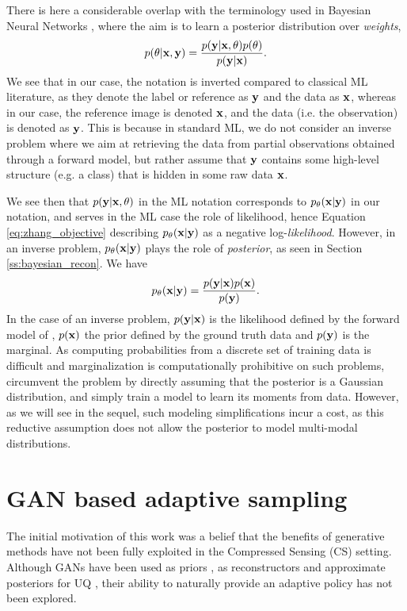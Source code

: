 \begin{remark}
    There is here a considerable overlap with the terminology used in Bayesian Neural Networks \citep{kendall2017uncertainties}, where the aim is to learn a posterior distribution over \textit{weights}, 
    $$p(\theta|{\mathbf{x}},{\mathbf{y}}) = \frac{p({\mathbf{y}}|{\mathbf{x}},\theta) p(\theta)}{p({\mathbf{y}}|{\mathbf{x}})}.$$
    We see that in our case, the notation is inverted compared to classical ML literature, as they denote the label or reference as ${\mathbf{y}}$ and the data as ${\mathbf{x}}$, whereas in our case, the reference image is denoted ${\mathbf{x}}$, and the data (i.e. the observation) is denoted as ${\mathbf{y}}$. This is because in standard ML, we do not consider an inverse problem where we aim at retrieving the data from partial observations obtained through a forward model, but rather assume that ${\mathbf{y}}$ contains some high-level structure (e.g. a class) that is hidden in some raw data ${\mathbf{x}}$.

    We see then that $p({\mathbf{y}}|{\mathbf{x}},\theta)$ in the ML notation corresponds to $p_\theta({\mathbf{x}}|{\mathbf{y}})$ in our notation, and serves in the ML case the role of likelihood, hence Equation \ref{eq:zhang_objective} describing $p_\theta({\mathbf{x}}|{\mathbf{y}})$ as a negative log-\textit{likelihood}. However, in an inverse problem, $p_\theta({\mathbf{x}}|{\mathbf{y}})$ plays the role of \textit{posterior}, as seen in Section \ref{ss:bayesian_recon}. We have
    $$p_\theta({\mathbf{x}}|{\mathbf{y}}) = \frac{p({\mathbf{y}}|{\mathbf{x}})p({\mathbf{x}})}{p({\mathbf{y}})}.$$
    In the case of an inverse problem, $p({\mathbf{y}}|{\mathbf{x}})$ is the likelihood defined by the forward model of , $p({\mathbf{x}})$ the prior defined by the ground truth data and $p({\mathbf{y}})$ is the marginal. As computing probabilities from a discrete set of training data is difficult and marginalization is computationally prohibitive on such problems, \citet{zhang2019reducing} circumvent the problem by directly assuming that the posterior is a Gaussian distribution, and simply train a model to learn its moments from data. However, as we will see in the sequel, such modeling simplifications incur a cost, as this reductive assumption does not allow the posterior to model multi-modal distributions.
\end{remark}


\section{GAN based adaptive sampling}\label{ss:gan_sampling}
The initial motivation of this work was a belief that the benefits of generative methods have not been fully exploited in the Compressed Sensing (CS) setting. Although GANs have been used as priors \citep{bora2017compressed,narnhofer2019inverse}, as reconstructors \citep{yang_dagan_2018} and approximate posteriors for UQ \citep{adler2018deep}, their ability to naturally provide an adaptive policy has not been explored.

